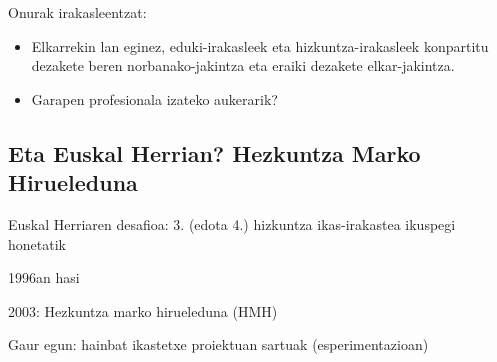 \documentclass[
]{book}
\providecommand{\tightlist}{%
  \setlength{\itemsep}{0pt}\setlength{\parskip}{0pt}}
\begin{document}
Onurak irakasleentzat:

\begin{itemize}
\tightlist
\item
  Elkarrekin lan eginez, eduki-irakasleek eta hizkuntza-irakasleek konpartitu dezakete beren norbanako-jakintza eta eraiki dezakete elkar-jakintza.
\item
  Garapen profesionala izateko aukerarik?
\end{itemize}

\hypertarget{eta-euskal-herrian-hezkuntza-marko-hirueleduna}{%
\subsection{Eta Euskal Herrian? Hezkuntza Marko Hirueleduna}\label{eta-euskal-herrian-hezkuntza-marko-hirueleduna}}

Euskal Herriaren desafioa: 3. (edota 4.) hizkuntza ikas-irakastea ikuspegi honetatik

1996an hasi

2003: Hezkuntza marko hirueleduna (HMH)

Gaur egun: hainbat ikastetxe proiektuan sartuak (esperimentazioan)
\end{document}
